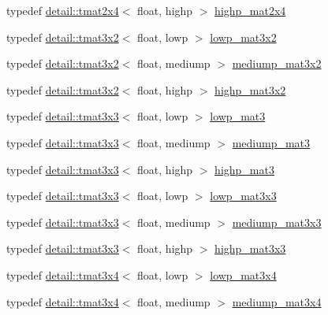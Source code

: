 \begin{DoxyCompactItemize}
\item 
typedef \hyperlink{structglm_1_1detail_1_1tmat2x4}{detail\+::tmat2x4}$<$ float, highp $>$ \hyperlink{group__core__precision_ga3cc506666b7a95db56f9d2eb787b6e20}{highp\+\_\+mat2x4}
\item 
typedef \hyperlink{structglm_1_1detail_1_1tmat3x2}{detail\+::tmat3x2}$<$ float, lowp $>$ \hyperlink{group__core__precision_ga17219f89f804dbf4620d4caacf32cfe2}{lowp\+\_\+mat3x2}
\item 
typedef \hyperlink{structglm_1_1detail_1_1tmat3x2}{detail\+::tmat3x2}$<$ float, mediump $>$ \hyperlink{group__core__precision_ga1215b70c2750b6e9ab813ced8dcae568}{mediump\+\_\+mat3x2}
\item 
typedef \hyperlink{structglm_1_1detail_1_1tmat3x2}{detail\+::tmat3x2}$<$ float, highp $>$ \hyperlink{group__core__precision_gabc7767293ff69cd56717ee9d8be62963}{highp\+\_\+mat3x2}
\item 
typedef \hyperlink{structglm_1_1detail_1_1tmat3x3}{detail\+::tmat3x3}$<$ float, lowp $>$ \hyperlink{group__core__precision_gaae2935658c6a3668ac1935a7f6064d51}{lowp\+\_\+mat3}
\item 
typedef \hyperlink{structglm_1_1detail_1_1tmat3x3}{detail\+::tmat3x3}$<$ float, mediump $>$ \hyperlink{group__core__precision_gacf45e22f1fb2703b181995676963a1f9}{mediump\+\_\+mat3}
\item 
typedef \hyperlink{structglm_1_1detail_1_1tmat3x3}{detail\+::tmat3x3}$<$ float, highp $>$ \hyperlink{group__core__precision_ga334034520a655db41a2e188951f6aaad}{highp\+\_\+mat3}
\item 
typedef \hyperlink{structglm_1_1detail_1_1tmat3x3}{detail\+::tmat3x3}$<$ float, lowp $>$ \hyperlink{group__core__precision_ga31688b397d10806ead332c3adb7dc0f0}{lowp\+\_\+mat3x3}
\item 
typedef \hyperlink{structglm_1_1detail_1_1tmat3x3}{detail\+::tmat3x3}$<$ float, mediump $>$ \hyperlink{group__core__precision_gae4c7f0d5d3dab712f9a671183e63e5ab}{mediump\+\_\+mat3x3}
\item 
typedef \hyperlink{structglm_1_1detail_1_1tmat3x3}{detail\+::tmat3x3}$<$ float, highp $>$ \hyperlink{group__core__precision_ga8a3703cc71cdfc8928eddf46b3763c4b}{highp\+\_\+mat3x3}
\item 
typedef \hyperlink{structglm_1_1detail_1_1tmat3x4}{detail\+::tmat3x4}$<$ float, lowp $>$ \hyperlink{group__core__precision_ga9cea06e7378fe59abf95c1f56edc4320}{lowp\+\_\+mat3x4}
\item 
typedef \hyperlink{structglm_1_1detail_1_1tmat3x4}{detail\+::tmat3x4}$<$ float, mediump $>$ \hyperlink{group__core__precision_ga5654236019c6a732844da31534a3cf28}{mediump\+\_\+mat3x4}

\end{DoxyCompactItemize}

